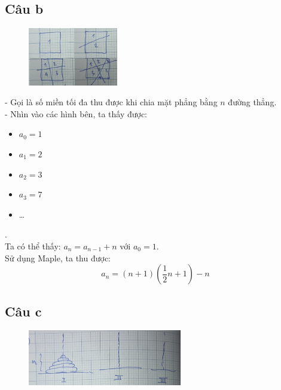 \documentclass[main.tex]{subfiles}
\begin{document}
\subsection{Câu b}
\begin{figure}
    \centering
    \includegraphics[width=0.35\textwidth]{image/Bai1b.png}
    \end{figure}
    
- Gọi  là số miền tối đa thu được khi chia mặt phẳng bằng $n$ đường thẳng.\\
- Nhìn vào các hình bên, ta thấy được: 
\begin{itemize}
    \item $a_0=1$
    \item $a_1=2$
    \item $a_2=3$
    \item $a_3=7$
    \item \dots 
\end{itemize}
.\\
Ta có thể thấy: $a_n = a_{n-1} + n$ với $a_0=1$.\\
Sử dụng Maple, ta thu được:
$$
a_n = \left(n+1\right)\left(\frac{1}{2}n+1\right)-n
$$

\subsection{Câu c}
\begin{figure}[H]
\centering
\includegraphics[width=0.6\textwidth]{image/Bai1c.png}
\end{figure}
\end{document}
